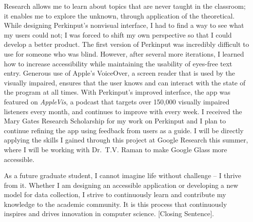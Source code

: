 Research allows me to learn about topics that are never taught in the classroom; it enables me to explore the unknown, through application of the theoretical. While designing Perkinput’s nonvisual interface, I had to find a way to see what my users could not; I was forced to shift my own perspective so that I could develop a better product. The first version of Perkinput was incredibly difficult to use for someone who was blind. However, after several more iterations, I learned how to increase accessibility while maintaining the usability of eyes-free text entry. Generous use of Apple’s VoiceOver, a screen reader that is used by the visually impaired, ensures that the user knows and can interact with the state of the program at all times. With Perkinput’s improved interface, the app was featured on {\it{AppleVis}}, a podcast that targets over 150,000 visually impaired listeners every month, and continues to improve with every week. I received the Mary Gates Research Scholarship for my work on Perkinput and I plan to continue refining the app using feedback from users as a guide. I will be directly applying the skills I gained through this project at Google Research this summer, where I will be working with Dr.\ T.V. Raman to make Google Glass more accessible.\vspace{1 mm}

As a future graduate student, I cannot imagine life without challenge – I thrive from it. Whether I am designing an accessible application or developing a new model for data collection, I strive to continuously learn and contribute my knowledge to the academic community. It is this process that continuously inspires and drives innovation in computer science. [Closing Sentence].



